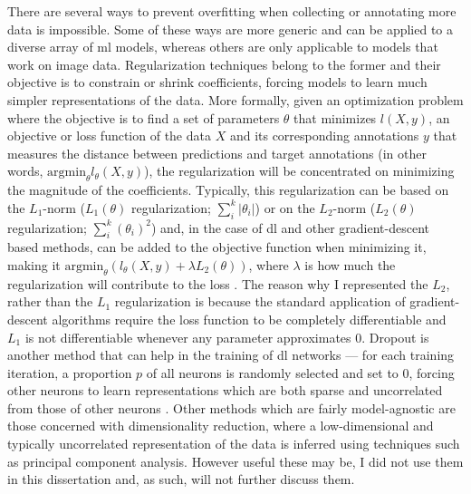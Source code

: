 There are several ways to prevent overfitting when collecting or annotating more data is impossible. Some of these ways are more generic and can be applied to a diverse array of \ac{ml} models, whereas others are only applicable to models that work on image data. Regularization techniques belong to the former and their objective is to constrain or shrink coefficients, forcing models to learn much simpler representations of the data. More formally, given an optimization problem where the objective is to find a set of parameters $\theta$ that minimizes $l(X,y)$, an objective or loss function of the data $X$ and its corresponding annotations $y$ that measures the distance between predictions and target annotations (in other words, $\mathrm{arg min}_{\theta}l_{\theta}(X,y)$), the regularization will be concentrated on minimizing the magnitude of the coefficients. Typically, this regularization can be based on the $L_1$-norm ($L_1(\theta)$ regularization; $\sum_i^k{|\theta_i|}$) or on the $L_2$-norm ($L_2(\theta)$ regularization; $\sum_i^k{(\theta_i)^2}$) and, in the case of \ac{dl} and other gradient-descent based methods, can be added to the objective function when minimizing it, making it $\mathrm{arg min}_{\theta}(l_{\theta}(X,y)+\lambda L_2(\theta))$, where $\lambda$ is how much the regularization will contribute to the loss \cite{James2013-py}. The reason why I represented the $L_2$, rather than the $L_1$ regularization is because the standard application of gradient-descent algorithms require the loss function to be completely differentiable and $L_1$ is not differentiable whenever any parameter approximates $0$. Dropout is another method that can help in the training of \ac{dl} networks --- for each training iteration, a proportion $p$ of all neurons is randomly selected and set to $0$, forcing other neurons to learn representations which are both sparse and uncorrelated from those of other neurons \cite{Srivastava2014a}. Other methods which are fairly model-agnostic are those concerned with dimensionality reduction, where a low-dimensional and typically uncorrelated representation of the data is inferred using techniques such as principal component analysis. However useful these may be, I did not use them in this dissertation and, as such, will not further discuss them.

